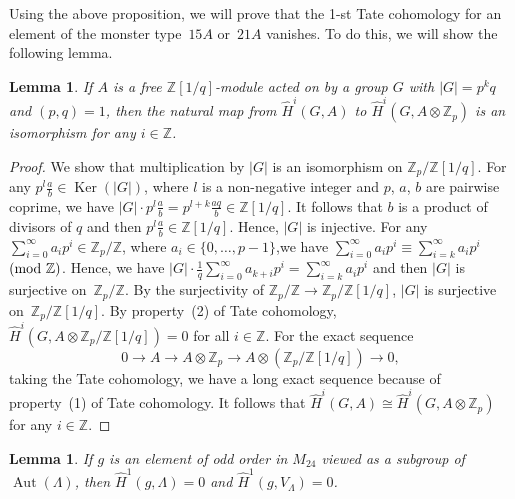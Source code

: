 \documentclass[pdftex]{sigma}%
\numberwithin{equation}{section}
\newtheorem{Lemma}[Theorem]{Lemma}
\begin{document}
Using the above proposition, we will prove that the 1-st Tate cohomology for an element of the monster type~$15A$ or~$21A$ vanishes. To do this, we will show the following lemma.

\begin{Lemma}\label{Zpkai}
If $A$ is a free $\mathbb{Z}[1/q]$-module acted on by a group $G$ with $|G|=p^kq $ and $(p,q)=1$, then the natural map from $\hat{H}^i(G,A)$ to $\hat{H}^i(G,A\otimes \mathbb{Z}_p)$ is an isomorphism for any $i\in \mathbb{Z}$.
\end{Lemma}

\begin{proof}
We show that multiplication by $|G|$ is an isomorphism on $\mathbb{Z}_p/\mathbb{Z}[1/q]$. For any $p^l\frac{a}{b} \in \operatorname{Ker}(|G|)$, where $l$ is a non-negative integer and $p$, $a$, $b$ are pairwise coprime, we have $|G|\cdot p^l\frac{a}{b}=p^{l+k}\frac{aq}{b} \in \mathbb{Z}[1/q]$. It follows that $b$ is a product of divisors of $q$ and then $p^l\frac{a}{b} \in \mathbb{Z}[1/q]$. Hence, $|G|$ is injective. For any $\sum_{i=0}^\infty a_ip^i \in \mathbb{Z}_p/\mathbb{Z}$, where $a_i \in \{0,\dots ,p-1\}$,we have $\sum_{i=0}^\infty a_ip^i \equiv \sum_{i=k}^\infty a_ip^i$ $({\rm mod}\ \mathbb{Z})$. Hence, we have $|G|\cdot \frac{1}{q}\sum_{i=0}^\infty a_{k+i}p^i=\sum_{i=k}^\infty a_ip^i$ and then $|G|$ is surjective on~$\mathbb{Z}_p/\mathbb{Z}$. By the surjectivity of $\mathbb{Z}_p/\mathbb{Z}\rightarrow \mathbb{Z}_p/\mathbb{Z}[1/q]$, $|G|$ is surjective on~$\mathbb{Z}_p/\mathbb{Z}[1/q]$. By property~(2) of Tate cohomology, $\hat{H}^i(G,A\otimes \mathbb{Z}_p/\mathbb{Z}[1/q])=0$ for all $i\in \mathbb{Z}$. For the exact sequence
\[
0\rightarrow A\rightarrow A\otimes \mathbb{Z}_p\rightarrow A\otimes (\mathbb{Z}_p/\mathbb{Z}[1/q])\rightarrow 0,
\]
 taking the Tate cohomology, we have a long exact sequence because of property~(1) of Tate cohomology. It follows that $\hat{H}^i(G,A)\cong \hat{H}^i(G,A\otimes \mathbb{Z}_p)$ for any $i\in \mathbb{Z}$.
\end{proof}

\begin{Lemma}\label{lattice15A}
If $g$ is an element of odd order in $M_{24}$ viewed as a subgroup of $\operatorname{Aut}(\Lambda)$, then $\hat{H}^1(g,\Lambda)=0$ and $\hat{H}^1(g,V_\Lambda)=0$.
\end{Lemma}
\end{document}
